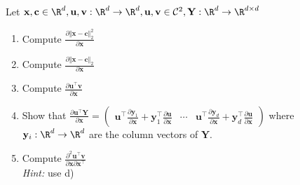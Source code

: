 Let $\mathbf{x}, \mathbf{c} \in \R^d, \mathbf{u},\mathbf{v}: \R^d \rightarrow \R^d,  \mathbf{u},\mathbf{v} \in \mathcal{C}^2, \mathbf{Y}: \R^d \rightarrow \R^{d\times d}$
\begin{enumerate}
	\item Compute $\frac{\partial \Vert \mathbf{x} - \mathbf{c}  \Vert^2_2}{\partial \mathbf{x}}$
	\item Compute $\frac{\partial \Vert \mathbf{x} - \mathbf{c}  \Vert_2}{\partial
	\mathbf{x}}$
	\item Compute $\frac{\partial \mathbf{u}^\top \mathbf{v}}{\partial \mathbf{x}}$
	\item Show that $\frac{\partial \mathbf{u}^\top \mathbf{Y}}{\partial\mathbf{x}} = \begin{pmatrix}\mathbf{u}^\top\frac{\partial  \mathbf{y}_1}{\partial\mathbf{x}} + \mathbf{y}_1^\top\frac{\partial  \mathbf{u}}{\partial\mathbf{x}} & \cdots & \mathbf{u}^\top\frac{\partial  \mathbf{y}_d}{\partial\mathbf{x}} + \mathbf{y}_d^\top\frac{\partial  \mathbf{u}}{\partial\mathbf{x}}\end{pmatrix}$ where $\mathbf{y}_i:\R^d\rightarrow\R^d$ are the column vectors of  $\mathbf{Y}.$
	\item Compute $\frac{\partial^2 \mathbf{u}^\top \mathbf{v}}{\partial \mathbf{x}\partial\mathbf{x}^\top}$ \\
	\textit{Hint:} use d)
	
\end{enumerate}
